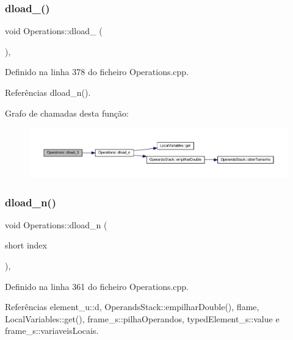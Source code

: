 \subsubsection{\texorpdfstring{dload\+\_()}{dload\_3()}}
{\footnotesize\ttfamily void Operations\+::dload\+\_ (\begin{DoxyParamCaption}{ }\end{DoxyParamCaption})\hspace{0.3cm}{\ttfamily [static]}, {\ttfamily [private]}}



Definido na linha 378 do ficheiro Operations.\+cpp.



Referências dload\+\_\+n().

Grafo de chamadas desta função\+:
\nopagebreak
\begin{figure}[H]
\begin{center}
\leavevmode
\includegraphics[width=350pt]{classOperations_ab3a0a107f5c4a791c71b727142a69523_cgraph}
\end{center}
\end{figure}
\mbox{\label{classOperations_a44536bc4112eb4eebe23ff85e9b7d02b}} 
\subsubsection{\texorpdfstring{dload\+\_\+n()}{dload\_n()}}
{\footnotesize\ttfamily void Operations\+::dload\+\_\+n (\begin{DoxyParamCaption}\item[{short}]{index }\end{DoxyParamCaption})\hspace{0.3cm}{\ttfamily [static]}, {\ttfamily [private]}}



Definido na linha 361 do ficheiro Operations.\+cpp.



Referências element\+\_\+u\+::d, Operands\+Stack\+::empilhar\+Double(), flame, Local\+Variables\+::get(), frame\+\_\+s\+::pilha\+Operandos, typed\+Element\+\_\+s\+::value e frame\+\_\+s\+::variaveis\+Locais.



